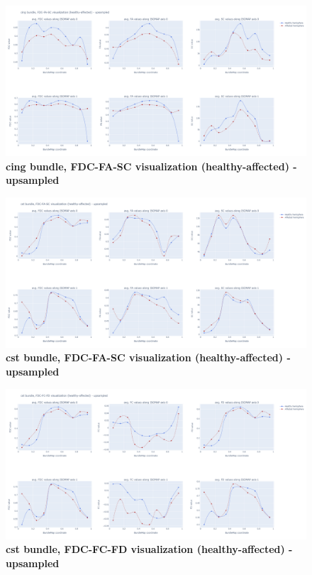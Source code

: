 \documentclass[thesis.tex]{subfiles}
\begin{document}
\begin{figure}
  \centering
  \includegraphics[width=24cm]{thesis_radomskyi/apendix/cing bundle, FDC-FA-SC visualization (healthy-affected) - upsampled.png}
    \caption{\textbf{cing bundle, FDC-FA-SC visualization (healthy-affected) - upsampled}}
\end{figure}

\begin{figure}
  \centering
  \includegraphics[width=24cm]{thesis_radomskyi/apendix/cst bundle, FDC-FA-SC visualization (healthy-affected) - upsampled.png}
    \caption{\textbf{cst bundle, FDC-FA-SC visualization (healthy-affected) - upsampled}}
\end{figure}

\begin{figure}
  \centering
  \includegraphics[width=24cm]{thesis_radomskyi/apendix/cst bundle, FDC-FC-FD visualization (healthy-affected) - upsampled.png}
    \caption{\textbf{cst bundle, FDC-FC-FD visualization (healthy-affected) - upsampled}}
\end{figure}
\end{document}
